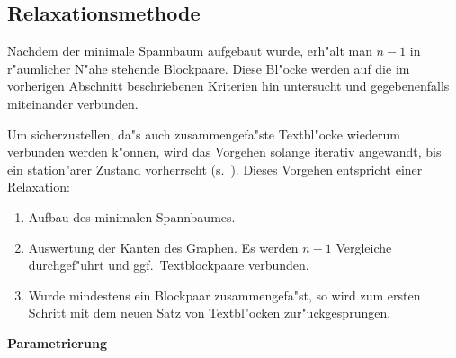 \subsection{Relaxationsmethode}

Nachdem der minimale Spannbaum aufgebaut wurde, erh"alt man $n-1$
in r"aumlicher N"ahe stehende Blockpaare. Diese Bl"ocke werden auf die im vorherigen Abschnitt
beschriebenen Kriterien hin untersucht und gegebenenfalls miteinander verbunden.

Um sicherzustellen, da"s auch zusammengefa"ste Textbl"ocke wiederum verbunden werden k"onnen,
wird das Vorgehen solange iterativ angewandt, bis ein station"arer Zustand vorherrscht
(s.\ ). Dieses Vorgehen entspricht einer Relaxation:

\begin{enumerate}
  \item Aufbau des minimalen Spannbaumes.
  \item Auswertung der Kanten des Graphen. Es werden $n-1$ Vergleiche durchgef"uhrt und ggf.\
        Textblockpaare verbunden.
  \item Wurde mindestens ein Blockpaar zusammengefa"st, so wird zum ersten Schritt mit dem neuen
        Satz von Textbl"ocken zur"uckgesprungen.
\end{enumerate}


{\bf Parametrierung}


\clearpage


